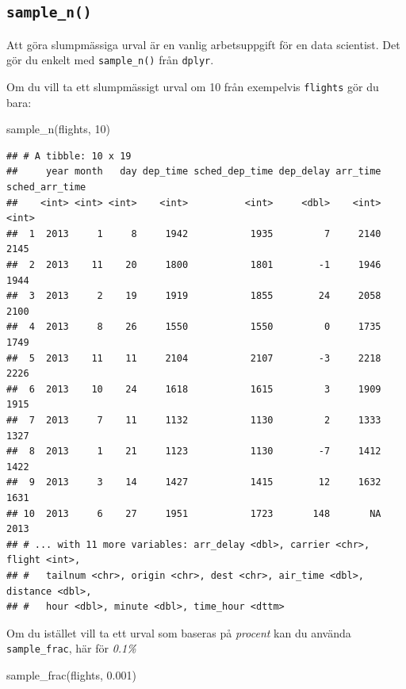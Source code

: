 \documentclass[
]{book}
\newenvironment{Shaded}{\begin{snugshade}}{\end{snugshade}}
\newcommand{\DecValTok}[1]{\textcolor[rgb]{0.00,0.00,0.81}{#1}}
\newcommand{\FloatTok}[1]{\textcolor[rgb]{0.00,0.00,0.81}{#1}}
\newcommand{\FunctionTok}[1]{\textcolor[rgb]{0.00,0.00,0.00}{#1}}
\newcommand{\NormalTok}[1]{#1}
\begin{document}
\hypertarget{sample_n}{%
\subsection{\texorpdfstring{\texttt{sample\_n()}}{sample\_n()}}\label{sample_n}}

Att göra slumpmässiga urval är en vanlig arbetsuppgift för en data scientist. Det gör du enkelt med \texttt{sample\_n()} från \texttt{dplyr}.

Om du vill ta ett slumpmässigt urval om 10 från exempelvis \texttt{flights} gör du bara:

\begin{Shaded}
\begin{Highlighting}[]
\FunctionTok{sample\_n}\NormalTok{(flights, }\DecValTok{10}\NormalTok{)}
\end{Highlighting}
\end{Shaded}

\begin{verbatim}
## # A tibble: 10 x 19
##     year month   day dep_time sched_dep_time dep_delay arr_time sched_arr_time
##    <int> <int> <int>    <int>          <int>     <dbl>    <int>          <int>
##  1  2013     1     8     1942           1935         7     2140           2145
##  2  2013    11    20     1800           1801        -1     1946           1944
##  3  2013     2    19     1919           1855        24     2058           2100
##  4  2013     8    26     1550           1550         0     1735           1749
##  5  2013    11    11     2104           2107        -3     2218           2226
##  6  2013    10    24     1618           1615         3     1909           1915
##  7  2013     7    11     1132           1130         2     1333           1327
##  8  2013     1    21     1123           1130        -7     1412           1422
##  9  2013     3    14     1427           1415        12     1632           1631
## 10  2013     6    27     1951           1723       148       NA           2013
## # ... with 11 more variables: arr_delay <dbl>, carrier <chr>, flight <int>,
## #   tailnum <chr>, origin <chr>, dest <chr>, air_time <dbl>, distance <dbl>,
## #   hour <dbl>, minute <dbl>, time_hour <dttm>
\end{verbatim}

Om du istället vill ta ett urval som baseras på \emph{procent} kan du använda \texttt{sample\_frac}, här för \emph{0.1\%}

\begin{Shaded}
\begin{Highlighting}[]
\FunctionTok{sample\_frac}\NormalTok{(flights, }\FloatTok{0.001}\NormalTok{)}
\end{Highlighting}
\end{Shaded}
\end{document}
